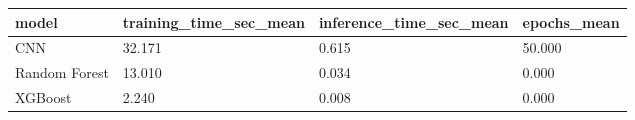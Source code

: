 \begin{tabular}{llll}
\toprule
model & training_time_sec_mean & inference_time_sec_mean & epochs_mean \\
\midrule
CNN & 32.171 & 0.615 & 50.000 \\
Random Forest & 13.010 & 0.034 & 0.000 \\
XGBoost & 2.240 & 0.008 & 0.000 \\
\bottomrule
\end{tabular}
